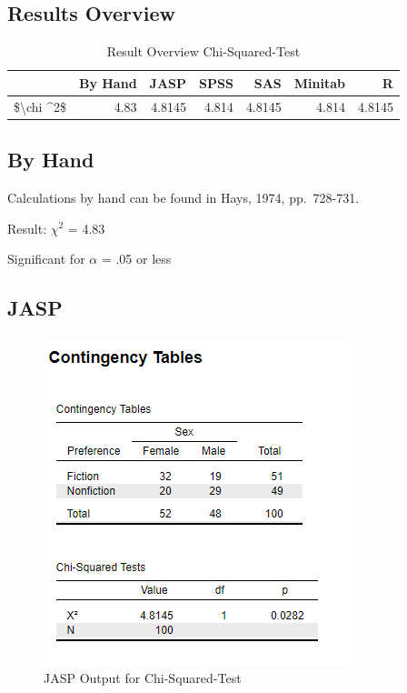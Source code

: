 \documentclass[
]{book}
\begin{document}
\hypertarget{results-overview-2}{%
\subsection{Results Overview}\label{results-overview-2}}

\begin{table}

\caption{\label{tab:unnamed-chunk-111}Result Overview Chi-Squared-Test}
\centering
\begin{tabular}[t]{lrrrrrr}
\toprule
  & By Hand & JASP & SPSS & SAS & Minitab & R\\
\midrule
\$\textbackslash{}chi \textasciicircum{}2\$ & 4.83 & 4.8145 & 4.814 & 4.8145 & 4.814 & 4.8145\\
\bottomrule
\end{tabular}
\end{table}

\hypertarget{by-hand-1}{%
\subsection{By Hand}\label{by-hand-1}}

Calculations by hand can be found in Hays, 1974, pp.~728-731.

Result: \(\chi ^2\) = 4.83

Significant for \(\alpha\) = .05 or less

\hypertarget{jasp-2}{%
\subsection{JASP}\label{jasp-2}}

\begin{figure}[!h]
\includegraphics{Screenshots/Chi Squared/ChiSquaredJASP} \caption{\label{fig:cstJASP}JASP Output for Chi-Squared-Test}\label{fig:cstJASP}
\end{figure}
\end{document}
